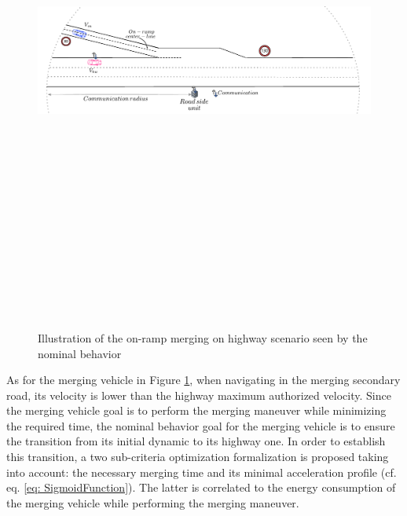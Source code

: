      \begin{figure}[!h]
        \centering 
        \includegraphics[width=13cm,height=18cm,keepaspectratio]{chapters/Chapitre_6/Figures/Nominal_Scene.pdf}
        \caption{Illustration of the on-ramp merging on highway scenario seen by the nominal behavior}
        \label{fig:illustration_nominal_behavior}
        \end{figure}




As for the merging vehicle in Figure \ref{fig:illustration_nominal_behavior}, when navigating in the merging secondary road, its velocity is lower than the highway maximum authorized velocity. Since the merging vehicle goal is to perform the merging maneuver while minimizing the required time, the nominal behavior goal for the merging vehicle is to ensure the transition from its initial dynamic to its highway one. In order to establish this transition, a two sub-criteria optimization formalization is proposed taking into account: the necessary merging time and its minimal acceleration profile (cf. eq. \ref{eq: SigmoidFunction}). The latter is correlated to the energy consumption of the merging vehicle while performing the merging maneuver. 



